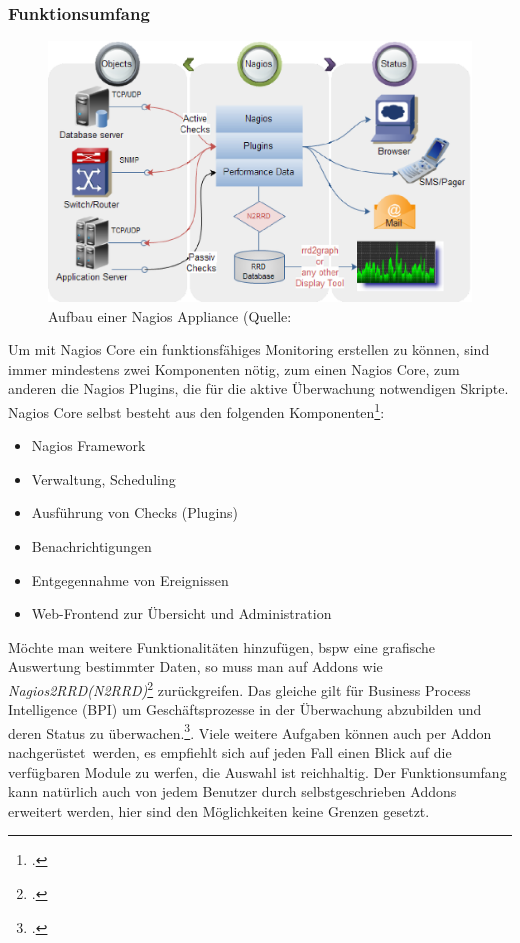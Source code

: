 \documentclass[12pt,a4paper,parskip,listof=totoc,bibliography=totoc]{scrreprt}
\begin{document}
	\subsubsection{Funktionsumfang}
	\begin{figure}
		\centering
		\includegraphics[width=1\textwidth]{pics/NagiosMonitoring.eps}
		\caption[Grober Aufbau von Nagios]{Aufbau einer Nagios Appliance (Quelle: \textcite{nagiosaufbau}}
		\label{fig:nagiosaufbau}
	\end{figure}
	Um mit Nagios Core ein funktionsfähiges Monitoring erstellen zu können, sind immer mindestens zwei Komponenten nötig, zum einen Nagios Core, zum anderen die Nagios Plugins, die für die aktive Überwachung notwendigen Skripte.
	Nagios Core selbst besteht aus den folgenden Komponenten\footcite{veltnagios1}:
	\begin{itemize}
		\item Nagios Framework
		\item Verwaltung, Scheduling
		\item Ausführung von Checks (Plugins)
		\item Benachrichtigungen
		\item Entgegennahme von Ereignissen
		\item Web-Frontend zur Übersicht und Administration
	\end{itemize}
	Möchte man weitere Funktionalitäten hinzufügen, \acrlong{bspw} eine grafische Auswertung bestimmter Daten, so muss man auf Addons wie \textit{Nagios2RRD(N2RRD)}\footcite{n2rrdprojecthome} zurückgreifen. Das gleiche gilt für Business Process Intelligence (BPI) um Geschäftsprozesse in der Überwachung abzubilden und deren Status zu überwachen.\footcite{nagiosbpi}. Viele weitere Aufgaben können auch per Addon \glqq nachgerüstet\grqq\ werden, es empfiehlt sich auf jeden Fall einen Blick auf die verfügbaren Module zu werfen, die Auswahl ist reichhaltig. Der Funktionsumfang kann natürlich auch von jedem Benutzer durch selbstgeschrieben Addons erweitert werden, hier sind den Möglichkeiten keine Grenzen gesetzt.
	\clearpage
	
\end{document}
